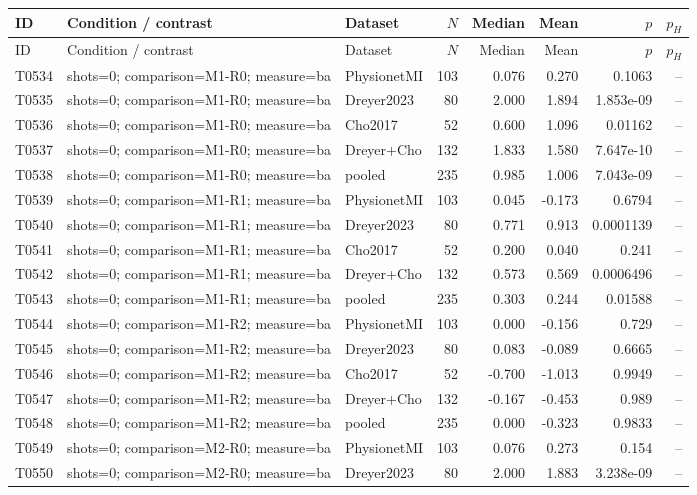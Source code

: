 \begin{longtable}{p{.45in}p{2.6in}p{.75in}rrrrr}
\toprule
ID & Condition / contrast & Dataset & $N$ & Median & Mean & $p$ & $p_H$ \\
\midrule
\endfirsthead
\toprule
ID & Condition / contrast & Dataset & $N$ & Median & Mean & $p$ & $p_H$ \\
\midrule
\endhead
T0534 & shots=0; comparison=M1-R0; measure=ba & PhysionetMI & 103 & 0.076 & 0.270 & 0.1063 & -- \\
T0535 & shots=0; comparison=M1-R0; measure=ba & Dreyer2023 & 80 & 2.000 & 1.894 & 1.853e-09 & -- \\
T0536 & shots=0; comparison=M1-R0; measure=ba & Cho2017 & 52 & 0.600 & 1.096 & 0.01162 & -- \\
T0537 & shots=0; comparison=M1-R0; measure=ba & Dreyer+Cho & 132 & 1.833 & 1.580 & 7.647e-10 & -- \\
T0538 & shots=0; comparison=M1-R0; measure=ba & pooled & 235 & 0.985 & 1.006 & 7.043e-09 & -- \\
T0539 & shots=0; comparison=M1-R1; measure=ba & PhysionetMI & 103 & 0.045 & -0.173 & 0.6794 & -- \\
T0540 & shots=0; comparison=M1-R1; measure=ba & Dreyer2023 & 80 & 0.771 & 0.913 & 0.0001139 & -- \\
T0541 & shots=0; comparison=M1-R1; measure=ba & Cho2017 & 52 & 0.200 & 0.040 & 0.241 & -- \\
T0542 & shots=0; comparison=M1-R1; measure=ba & Dreyer+Cho & 132 & 0.573 & 0.569 & 0.0006496 & -- \\
T0543 & shots=0; comparison=M1-R1; measure=ba & pooled & 235 & 0.303 & 0.244 & 0.01588 & -- \\
T0544 & shots=0; comparison=M1-R2; measure=ba & PhysionetMI & 103 & 0.000 & -0.156 & 0.729 & -- \\
T0545 & shots=0; comparison=M1-R2; measure=ba & Dreyer2023 & 80 & 0.083 & -0.089 & 0.6665 & -- \\
T0546 & shots=0; comparison=M1-R2; measure=ba & Cho2017 & 52 & -0.700 & -1.013 & 0.9949 & -- \\
T0547 & shots=0; comparison=M1-R2; measure=ba & Dreyer+Cho & 132 & -0.167 & -0.453 & 0.989 & -- \\
T0548 & shots=0; comparison=M1-R2; measure=ba & pooled & 235 & 0.000 & -0.323 & 0.9833 & -- \\
T0549 & shots=0; comparison=M2-R0; measure=ba & PhysionetMI & 103 & 0.076 & 0.273 & 0.154 & -- \\
T0550 & shots=0; comparison=M2-R0; measure=ba & Dreyer2023 & 80 & 2.000 & 1.883 & 3.238e-09 & -- \\

\end{longtable}

